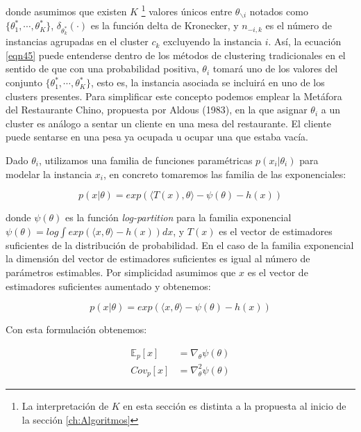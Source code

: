 donde asumimos que existen $K$ \footnote{La interpretación de $K$ en esta sección es distinta a la propuesta al inicio de la sección \ref{ch:Algoritmos}} valores únicos entre $\theta_{\backslash i}$ notados como $\{\theta_{1}^*, \cdots, \theta_{K}^*\}$, $\delta_{\theta_{k}^*}(\cdot)$ es la función delta de Kronecker, y $n_{-i,k}$ es el número de instancias agrupadas en el cluster $c_k$ excluyendo la instancia $i$. Así, la ecuación \ref{eqn45} puede entenderse dentro de los métodos de clustering tradicionales en el sentido de que con una probabilidad positiva, $\theta_i$ tomará uno de los valores del conjunto $\{\theta_{1}^*, \cdots, \theta_{K}^*\}$, esto es, la instancia asociada se incluirá en uno de los clusters presentes. Para simplificar este concepto podemos emplear la Metáfora del Restaurante Chino, propuesta por Aldous (1983), en la que asignar $\theta_i$ a un cluster es análogo a sentar un cliente en una mesa del restaurante. El cliente puede sentarse en una pesa ya ocupada u ocupar una que estaba vacía.

Dado $\theta_i$, utilizamos una familia de funciones paramétricas $p(x_i|\theta_i)$ para modelar la instancia $x_i$, en concreto tomaremos las familia de las exponenciales:

\begin{equation}
p(x|\theta) = exp(\langle T(x), \theta \rangle - \psi(\theta) - h(x))
\label{eqn46}
\end{equation}

donde $\psi(\theta)$ es la función \textit{log-partition} para la familia exponencial $\psi(\theta) = log \int exp(\langle x, \theta \rangle - h(x))dx$, y $T(x)$ es el vector de estimadores suficientes de la distribución de probabilidad. En el caso de la familia exponencial la dimensión del vector de estimadores suficientes es igual al número de parámetros estimables. Por simplicidad asumimos que $x$ es el vector de estimadores suficientes aumentado y obtenemos:

\begin{equation}
p(x|\theta) = exp(\langle x, \theta \rangle - \psi(\theta) - h(x))
\label{eqn47}
\end{equation}

Con esta formulación obtenemos:

\begin{equation}
\begin{split}
\mathbb{E}_p[x] &= \nabla_{\theta} \psi(\theta) \\
Cov_p[x] &= \nabla_{\theta}^2 \psi(\theta)
\end{split}
\label{eqn48}
\end{equation}

